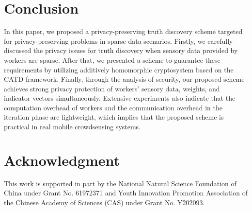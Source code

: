 \documentclass[conference]{IEEEtran}
\begin{document}
\section{Conclusion}\label{sec8}
In this paper, we proposed a privacy-preserving truth discovery scheme targeted for privacy-preserving problems in sparse data scenarios.
Firstly, we carefully discussed the privacy issues for truth discovery when sensory data provided by workers are sparse.
After that, we presented a scheme to guarantee these requirements by utilizing additively homomorphic cryptosystem based on the CATD framework.
Finally, through the analysis of security, our proposed scheme achieves strong privacy protection of workers' sensory data, weights, and indicator vectors simultaneously.
Extensive experiments also indicate that the computation overhead of workers and the communication overhead in the iteration phase are lightweight, which implies that the proposed scheme is practical in real mobile crowdsensing systems.

\section*{Acknowledgment}
This work is supported in part by the National Natural Science Foundation of China under Grant No. 61972371 and Youth Innovation Promotion Association of the Chinese Academy of Sciences (CAS) under Grant No. Y202093.

% 
% 
\end{document}
